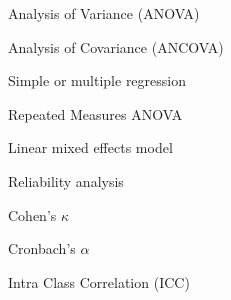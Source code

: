 \documentclass[9pt,ignorenonframetext,xcolor=dvipsnames]{beamer}
\begin{document}
\begin{frame}{Analysis of Variance (ANOVA)}

\end{frame}

\begin{frame}{Analysis of Covariance (ANCOVA)}

\end{frame}

\begin{frame}{Simple or multiple regression}

\end{frame}

\begin{frame}{Repeated Measures ANOVA}

\end{frame}

\begin{frame}{Linear mixed effects model}

\end{frame}

\begin{frame}{Reliability analysis}

\begin{block}{Cohen's \(\kappa\)}

\end{block}

\begin{block}{Cronbach's \(\alpha\)}

\end{block}

\begin{block}{Intra Class Correlation (ICC)}

\end{block}

\end{frame}
\end{document}
